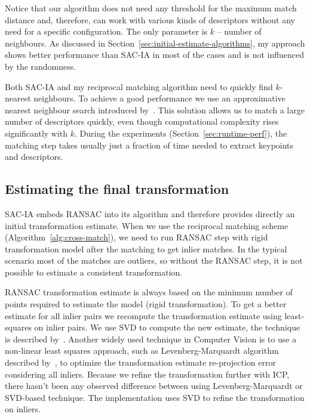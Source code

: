 Notice that our algorithm does not need any threshold for the maximum match distance and, therefore, can work with various kinds of descriptors without any need for a specific configuration. The only parameter is $k$ -- number of neighbours. As discussed in Section~\ref{sec:initial-estimate-algorithms}, my approach shows better performance than \gls{SAC-IA} in most of the cases and is not influenced by the randomness.

Both \gls{SAC-IA} and my reciprocal matching algorithm need to quickly find $k$-nearest neighbours. To achieve a good performance we use an approximative nearest neighbour search introduced by~\citet{muja2014flann}. This solution allows us to match a large number of descriptors quickly, even though computational complexity rises significantly with $k$. During the experiments (Section~\ref{sec:runtime-perf}), the matching step takes usually just a fraction of time needed to extract keypoints and descriptors.

\subsection{Estimating the final transformation}
\label{sec:final-estimation}

\gls{SAC-IA} embeds \gls{RANSAC} into its algorithm and therefore provides directly an initial transformation estimate. When we use the reciprocal matching scheme (Algorithm~\ref{alg:cross-match}), we need to run \gls{RANSAC} step with rigid transformation model after the matching to get inlier matches. In the typical scenario most of the matches are outliers, so without the \gls{RANSAC} step, it is not possible to estimate a consistent transformation.

\gls{RANSAC} transformation estimate is always based on the minimum number of points required to estimate the model (rigid transformation). To get a better estimate for all inlier pairs we recompute the transformation estimate using least-squares on inlier pairs. We use \gls{SVD} to compute the new estimate, the technique is described by~\citet{golub1970svd}. Another widely used technique in Computer Vision is to use a non-linear least squares approach, such as Levenberg-Marquardt algorithm described by~\citet{more1978levmarq}, to optimize the transformation estimate re-projection error considering all inliers. Because we refine the transformation further with \gls{ICP}, there hasn't been any observed difference between using Levenberg-Marquardt or \gls{SVD}-based technique. The implementation uses \gls{SVD} to refine the transformation on inliers.

